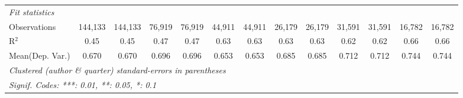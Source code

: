 \begin{tabular}{lcccccccccccc}
   \midrule
   \emph{Fit statistics}\\
   Observations                             & 144,133       & 144,133        & 76,919        & 76,919         & 44,911        & 44,911        & 26,179        & 26,179        & 31,591       & 31,591      & 16,782       & 16,782\\  
   R$^2$                                    & 0.45          & 0.45           & 0.47          & 0.47           & 0.63          & 0.63          & 0.63          & 0.63          & 0.62         & 0.62        & 0.66         & 0.66\\  
Mean(Dep. Var.) & 0.670 & 0.670 & 0.696 & 0.696 & 0.653 & 0.653 & 0.685 & 0.685 & 0.712 & 0.712 & 0.744 & 0.744 \\
   \midrule \midrule
   \multicolumn{13}{l}{\emph{Clustered (author \& quarter) standard-errors in parentheses}}\\
   \multicolumn{13}{l}{\emph{Signif. Codes: ***: 0.01, **: 0.05, *: 0.1}}\\
\end{tabular}
\par\endgroup
